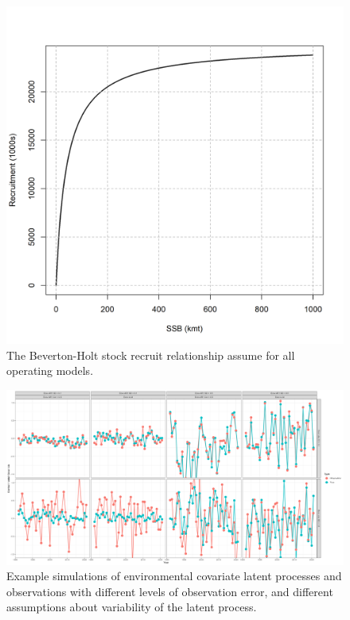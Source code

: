 \documentclass[
  12pt,
]{article}
\begin{document}
\begin{figure}
\caption{The Beverton-Holt stock recruit relationship assume for all operating models.}\label{om_sr}
\begin{center}
\includegraphics[width = \textwidth]{om_sr.png}
\end{center}
\end{figure}

\begin{figure}
\caption{Example simulations of environmental covariate latent processes and observations with different levels of observation error, and different assumptions about variability of the latent process.}\label{om_ecov_example}
\begin{center}
\includegraphics[width = \textwidth]{Ecov_true_obs_example.png}
\end{center}
\end{figure}
\end{document}
